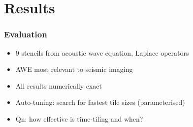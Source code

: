 \documentclass{beamer}
\begin{document}
%



\section{Results}

\begin{frame}
\frametitle{Evaluation}

\begin{itemize}
	\item 9 stencils from acoustic wave equation, Laplace operators
	\item AWE most relevant to seismic imaging
	\item All results numerically exact
	\item Auto-tuning: search for fastest tile sizes (parameterised)
	\newline
	\item Qn: how effective is time-tiling and when?
\end{itemize}
\end{frame}
\end{document}

